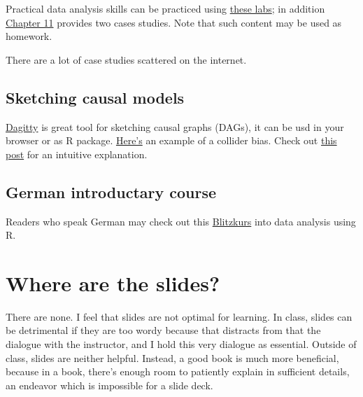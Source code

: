 \documentclass[
  letterpaper,
  DIV=11,
  numbers=noendperiod]{scrreprt}
\theoremstyle{definition}
\theoremstyle{definition}
\theoremstyle{remark}
\begin{document}
Practical data analysis skills can be practiced using
\href{https://moderndive.github.io/moderndive_labs/index.html}{these
labs}; in addition
\href{https://moderndive.com/11-thinking-with-data.html}{Chapter 11}
provides two cases studies. Note that such content may be used as
homework.

There are a lot of case studies scattered on the internet.

\hypertarget{sketching-causal-models}{%
\subsection*{Sketching causal models}\label{sketching-causal-models}}

\href{http://dagitty.net/dags.html}{Dagitty} is great tool for sketching
causal graphs (DAGs), it can be usd in your browser or as R package.
\href{dagitty.net/mmxqlaB}{Here's} an example of a collider bias. Check
out
\href{https://data-se.netlify.app/2020/06/04/when-adding-variable-hurts-the-collider-bias/}{this
post} for an intuitive explanation.

\hypertarget{german-introductary-course}{%
\subsection*{German introductary
course}\label{german-introductary-course}}

Readers who speak German may check out this
\href{https://sebastiansauer.github.io/r-blitzkurs/}{Blitzkurs} into
data analysis using R.

\hypertarget{where-are-the-slides}{%
\section*{Where are the slides?}\label{where-are-the-slides}}

There are none. I feel that slides are not optimal for learning. In
class, slides can be detrimental if they are too wordy because that
distracts from that the dialogue with the instructor, and I hold this
very dialogue as essential. Outside of class, slides are neither
helpful. Instead, a good book is much more beneficial, because in a
book, there's enough room to patiently explain in sufficient details, an
endeavor which is impossible for a slide deck.
\end{document}
